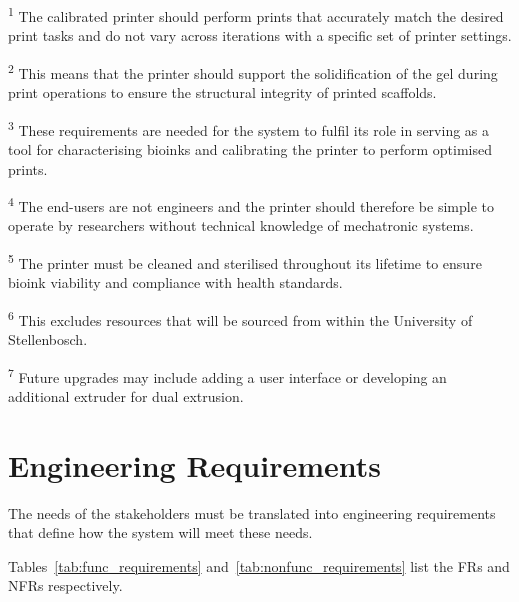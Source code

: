 {\footnotesize
\noindent\textsuperscript{1} The calibrated printer should perform prints that accurately match the desired print tasks and do not vary across iterations with a specific set of printer settings.

\noindent\textsuperscript{2} This means that the printer should support the solidification of the gel during print operations to ensure the structural integrity of printed scaffolds.

\noindent\textsuperscript{3} These requirements are needed for the system to fulfil its role in serving as a tool for characterising bioinks and calibrating the printer to perform optimised prints.

\noindent\textsuperscript{4} The end-users are not engineers and the printer should therefore be simple to operate by researchers without technical knowledge of mechatronic systems.

\noindent\textsuperscript{5} The printer must be cleaned and sterilised throughout its lifetime to ensure bioink viability and compliance with health standards.

\noindent\textsuperscript{6} This excludes resources that will be sourced from within the University of Stellenbosch.

\noindent\textsuperscript{7} Future upgrades may include adding a user interface or developing an additional extruder for dual extrusion.
}


\section{Engineering Requirements}
The needs of the stakeholders must be translated into engineering requirements that define how the system will meet these needs.

Tables~\ref{tab:func_requirements} and~\ref{tab:nonfunc_requirements} list the FRs and NFRs respectively.

